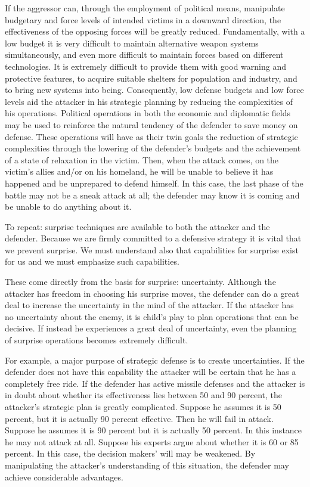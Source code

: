 If the aggressor can, through the employment of political means, manipulate budgetary and force levels of intended victims in a downward direction, the effectiveness of the opposing forces will be greatly reduced. Fundamentally, with a low budget it is very difficult to maintain alternative weapon systems simultaneously, and even more difficult to maintain forces based on different technologies. It is extremely difficult to provide them with good warning and protective features, to acquire suitable shelters for population and industry, and to bring new systems into being. Consequently, low defense budgets and low force levels aid the attacker in his strategic planning by reducing the complexities of his operations. Political operations in both the economic and diplomatic fields may be used to reinforce the natural tendency of the defender to save money on defense. These operations will have as their twin goals the reduction of strategic complexities through the lowering of the defender's budgets and the achievement of a state of relaxation in the victim. Then, when the attack comes, on the victim's allies and/or on his homeland, he will be unable to believe it has happened and be unprepared to defend himself. In this case, the last phase of the battle may not be a sneak attack at all; the defender may know it is coming and be unable to do anything about it.

To repeat: surprise techniques are available to both the attacker and the defender. Because we are firmly committed to a defensive strategy it is vital that we prevent surprise. We must understand also that capabilities for surprise exist for us and we must emphasize such capabilities.

These come directly from the basis for surprise: uncertainty. Although the attacker has freedom in choosing his surprise moves, the defender can do a great deal to increase the uncertainty in the mind of the attacker. If the attacker has no uncertainty about the enemy, it is child's play to plan operations that can be decisive. If instead he experiences a great deal of uncertainty, even the planning of surprise operations becomes extremely difficult.

For example, a major purpose of strategic defense is to create uncertainties. If the defender does not have this capability the attacker will be certain that he has a completely free ride. If the defender has active missile defenses and the attacker is in doubt about whether its effectiveness lies between 50 and 90 percent, the attacker's strategic plan is greatly complicated. Suppose he assumes it is 50 percent, but it is actually 90 percent effective. Then he will fail in attack. Suppose he assumes it is 90 percent but it is actually 50 percent. In this instance he may not attack at all. Suppose his experts argue about whether it is 60 or 85 percent. In this case, the decision makers' will may be weakened. By manipulating the attacker's understanding of this situation, the defender may achieve considerable advantages.

